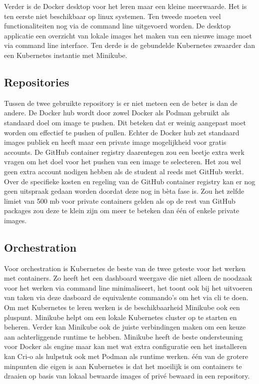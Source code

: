 Verder is de Docker desktop voor het leren maar een kleine meerwaarde. Het is ten eerste niet beschikbaar op linux systemen. Ten tweede moeten veel functionaliteiten nog via de command line uitgevoerd worden. De desktop applicatie een overzicht van lokale images het maken van een nieuwe image moet via command line interface. Ten derde is de gebundelde Kubernetes zwaarder dan een Kubernetes instantie met Minikube.

\subsection{Repositories}

Tussen de twee gebruikte repository is er niet meteen een de beter is dan de andere. De Docker hub wordt door zowel Docker als Podman gebruikt als standaard doel om image te pushen. Dit beteken dat er weinig aangepast moet worden om effectief te pushen of pullen. Echter de Docker hub zet standaard images publiek en heeft maar een private image mogelijkheid voor gratis accounts. De GitHub container registry daarentegen zou een beetje extra werk vragen om het doel voor het pushen van een image te selecteren. Het zou wel geen extra account nodigen hebben als de student al reeds met GitHub werkt. Over de specifieke kosten en regeling van de GitHub container registry kan er nog geen uitspraak gedaan worden doordat deze nog in bèta fase is. Zou het zelfde limiet  van 500 mb voor private containers gelden als op de rest van GitHub packages zou deze te klein zijn om meer te beteken dan één of enkele private images.

\subsection{Orchestration}

Voor orchestration is Kubernetes de beste van de twee geteste voor het werken met containers. Zo heeft het een dashboard weergave die niet alleen de noodzaak voor het werken via command line minimaliseert, het toont ook bij het uitvoeren van taken via deze dasboard de equivalente commando’s om het via cli te doen. Om met Kubernetes te leren werken is de beschikbaarheid Minikube ook een pluspunt. Minikube helpt om een lokale Kubernetes cluster op te starten en beheren. Verder kan Minikube ook de juiste verbindingen maken om een keuze aan achterliggende runtime te hebben.  Minikube heeft de beste ondersteuning voor Docker als engine maar kan met wat extra configuratie een het installeren kan Cri-o als hulpstuk ook met Podman als runtime werken. één van de grotere minpunten die eigen is aan Kubernetes is dat het moeilijk is om containers te draaien op basis van lokaal bewaarde images of privé bewaard in een repository.

